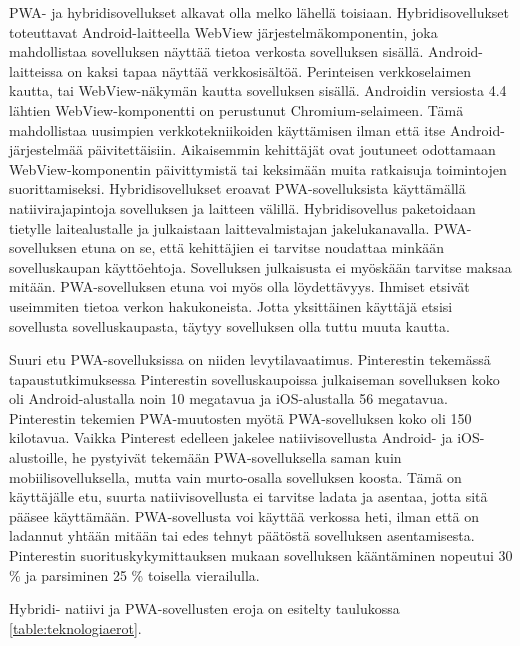 \documentclass{tktltiki}
\begin{document}
PWA- ja hybridisovellukset alkavat olla melko lähellä toisiaan. Hybridisovellukset toteuttavat Android-laitteella WebView järjestelmäkomponentin, joka mahdollistaa sovelluksen näyttää tietoa verkosta sovelluksen sisällä. Android-laitteissa on kaksi tapaa näyttää verkkosisältöä. Perinteisen verkkoselaimen kautta, tai WebView-näkymän kautta sovelluksen sisällä. Androidin versiosta 4.4 \cite{chromedeveloper} lähtien WebView-komponentti on perustunut Chromium-selaimeen. Tämä mahdollistaa uusimpien verkkotekniikoiden käyttämisen ilman että itse Android-järjestelmää päivitettäisiin. Aikaisemmin kehittäjät ovat joutuneet odottamaan WebView-komponentin päivittymistä tai keksimään muita ratkaisuja toimintojen suorittamiseksi. Hybridisovellukset eroavat PWA-sovelluksista käyttämällä natiivirajapintoja sovelluksen ja laitteen välillä. Hybridisovellus paketoidaan tietylle laitealustalle ja julkaistaan laittevalmistajan jakelukanavalla. PWA-sovelluksen etuna on se, että kehittäjien ei tarvitse noudattaa minkään sovelluskaupan käyttöehtoja. Sovelluksen julkaisusta ei myöskään tarvitse maksaa mitään. PWA-sovelluksen etuna voi myös olla löydettävyys. Ihmiset etsivät useimmiten tietoa verkon hakukoneista. Jotta yksittäinen käyttäjä etsisi sovellusta sovelluskaupasta, täytyy sovelluksen olla tuttu muuta kautta. 

Suuri etu PWA-sovelluksissa on niiden levytilavaatimus. Pinterestin tekemässä tapaustutkimuksessa \cite{Osmani} Pinterestin sovelluskaupoissa julkaiseman sovelluksen koko oli Android-alustalla noin 10 megatavua ja iOS-alustalla 56 megatavua. Pinterestin tekemien PWA-muutosten myötä PWA-sovelluksen koko oli 150 kilotavua. Vaikka Pinterest edelleen jakelee natiivisovellusta Android- ja iOS-alustoille, he pystyivät tekemään PWA-sovelluksella saman kuin mobiilisovelluksella, mutta vain murto-osalla sovelluksen koosta. Tämä on käyttäjälle etu, suurta natiivisovellusta ei tarvitse ladata ja asentaa, jotta sitä pääsee käyttämään. PWA-sovellusta voi käyttää verkossa heti, ilman että on ladannut yhtään mitään tai edes tehnyt päätöstä sovelluksen asentamisesta. Pinterestin suorituskykymittauksen mukaan \cite{Osmani} sovelluksen kääntäminen nopeutui 30 \% ja parsiminen 25 \% toisella vierailulla.

Hybridi- natiivi ja PWA-sovellusten eroja on esitelty taulukossa \ref{table:teknologiaerot}.
\end{document}
